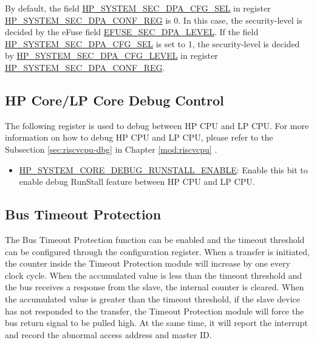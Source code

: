 \documentclass[main\_\_EN.tex]{subfiles}
\begin{document}
By default, the field \hyperref[fielddesc:HPSYSTEMSECDPALEVEL]{HP\_SYSTEM\_SEC\_DPA\_CFG\_SEL} in register \hyperref[regdesc:HPSYSTEMSECDPACONFREG]{HP\_SYSTEM\_SEC\_DPA\_CONF\_REG} is 0. In this case, the security-level is decided by the eFuse field \hyperref[fielddesc:EFUSESECDPALEVEL]{EFUSE\_SEC\_DPA\_LEVEL}. If the field \hyperref[fielddesc:HPSYSTEMSECDPALEVEL]{HP\_SYSTEM\_SEC\_DPA\_CFG\_SEL} is set to 1, the security-level is decided by \hyperref[fielddesc:HPSYSTEMSECDPALEVEL]{HP\_SYSTEM\_SEC\_DPA\_CFG\_LEVEL} in register \hyperref[regdesc:HPSYSTEMSECDPACONFREG]{HP\_SYSTEM\_SEC\_DPA\_CONF\_REG}.









\subsection{HP Core/LP Core Debug Control}

The following register is used to debug between HP CPU and LP CPU. For more information on how to debug HP CPU and LP CPU, please refer to the Subsection \ref{sec:riscvcpu-dbg} \textit{} in Chapter \ref{mod:riscvcpu} \textit{}.

\begin{itemize}
    \item \hyperref[fielddesc:HPSYSTEMCOREDEBUGRUNSTALLENABLE]{HP\_SYSTEM\_CORE\_DEBUG\_RUNSTALL\_ENABLE}: Enable this bit to enable debug RunStall feature between HP CPU and LP CPU.
\end{itemize}


\subsection{Bus Timeout Protection}

The Bus Timeout Protection function can be enabled and the timeout threshold can be configured through the configuration register. When a transfer is initiated, the counter inside the Timeout Protection module will increase by one every clock cycle. When the accumulated value is less than the timeout threshold and the bus receives a response from the slave, the internal counter is cleared. When the accumulated value is greater than the timeout threshold, if the slave device has not responded to the transfer, the Timeout Protection module will force the bus return signal to be pulled high. At the same time, it will report the interrupt and record the abnormal access address and master ID.
\end{document}
